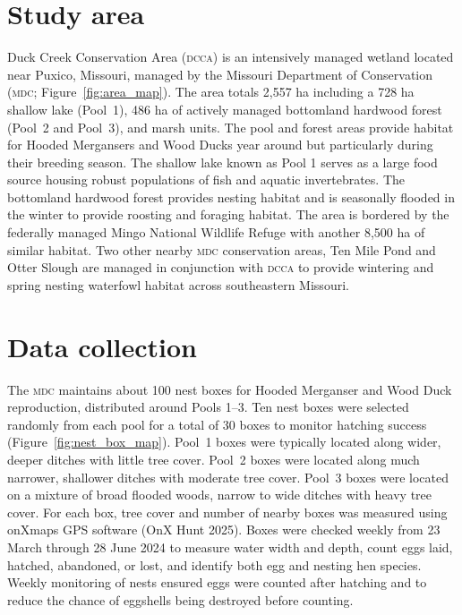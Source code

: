 
\section*{Study area}

Duck Creek Conservation Area \textsc{(dcca)} is an intensively managed wetland located near Puxico, Missouri, managed by the Missouri Department of Conservation (\textsc{mdc}; Figure~\ref{fig:area_map}). The area totals 2,557 ha including a 728 ha shallow lake (Pool~1), 486 ha of actively managed bottomland hardwood forest (Pool~2 and Pool~3), and marsh units. The pool and forest areas provide habitat for Hooded Mergansers and Wood Ducks year around but particularly during their breeding season. The shallow lake known as Pool 1 serves as a large food source housing robust populations of fish and aquatic invertebrates. The bottomland hardwood forest provides nesting habitat and is seasonally flooded in the winter to provide roosting and foraging habitat. The area is bordered by the federally managed Mingo National Wildlife Refuge with another 8,500 ha of similar habitat.  Two other nearby \textsc{mdc} conservation areas, Ten Mile Pond and Otter Slough are managed in conjunction with \textsc{dcca} to provide wintering and spring nesting waterfowl habitat across southeastern Missouri. 

 


\section*{Data collection}

The \textsc{mdc} maintains about 100 nest boxes for Hooded Merganser and Wood Duck reproduction, distributed around Pools 1–3.  Ten nest boxes were selected randomly from each pool for a total of 30 boxes to monitor hatching success (Figure~\ref{fig:nest_box_map}).  Pool~1  boxes were typically located along wider, deeper ditches with little tree cover. Pool~2 boxes were located along much narrower, shallower ditches with moderate tree cover. Pool~3 boxes were located on a mixture of broad flooded woods, narrow to wide ditches with heavy tree cover. For each box, tree cover and number of nearby boxes was measured using onXmaps GPS software (OnX Hunt 2025). Boxes were checked weekly from 23 March through 28 June 2024 to measure water width and depth, count eggs laid, hatched, abandoned, or lost, and identify both egg and nesting hen species. Weekly monitoring of nests ensured eggs were counted after hatching and to reduce the chance of eggshells being destroyed before counting. 

